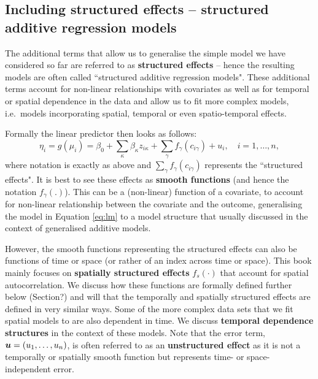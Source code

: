 
\subsection{Including structured effects -- structured additive regression models}\label{mod:lgm}
The additional terms that allow us to generalise the simple model we have considered so far  are referred to as \textbf{structured effects} -- hence the resulting models are often called ``structured additive regression models".  These additional terms account for non-linear relationships with covariates as well as for temporal or spatial dependence in the data and allow us to fit more complex models, i.e.\ models incorporating spatial, temporal or even spatio-temporal effects. 

Formally the linear predictor then looks as follows:
\begin{equation}	
\eta_i=g(\mu_i)=\beta_0+ \sum_{\kappa} \beta_{\kappa} z_{i \kappa}+\sum_{\gamma} f_{\gamma}(c_{i \gamma})+ u_i,\quad i=1,\ldots, n, \label{eq:lgm}
\end{equation}
where notation is exactly as above and $\sum_{\gamma} f_{\gamma}(c_{i \gamma})$ represents the ``structured effects". It is best to see these effects as \textbf{smooth functions}   (and hence the notation $f_{\gamma}(.)$). This can be a (non-linear) function of  a covariate, to account for non-linear relationship between the covariate and the outcome, generalising the model in Equation \ref{eq:lm} to a model structure that usually discussed in the context of generalised additive models. 

However, the smooth functions representing the structured effects can also be functions of time or space (or rather of an index across  time or space). This book mainly focuses  on \textbf{spatially structured effects} $f_s(\cdot)$ that account for spatial autocorrelation. We discuss how these functions are formally defined further below (Section?) and will that the temporally and spatially structured effects are defined in very similar ways. Some of the more complex data sets that we fit spatial models to are also dependent in time. We discuss \textbf{temporal dependence structures} in the context of these models. 
Note that the error term, $\boldsymbol{u} = (u_1, \ldots, u_n)$, is often referred to as an \textbf{unstructured effect} as it is not a temporally or spatially smooth function but represents time- or space-independent error. 

